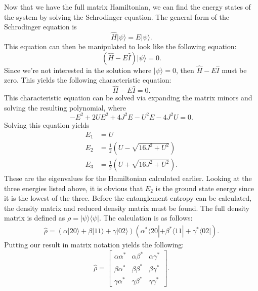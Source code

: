 \noindent Now that we have the full matrix Hamiltonian, we can find the energy states of the system by solving the Schrodinger equation. The general form of the Schrodinger equation is
\begin{equation}
\hat{H}|\psi\rangle = E|\psi\rangle.
\end{equation}
\noindent This equation can then be manipulated to look like the following equation:
\begin{equation}
\left( \hat{H}-E\hat{I} \right) |\psi\rangle = 0.
\end{equation}
\noindent Since we're not interested in the solution where $|\psi\rangle=0$, then $\hat{H}-E\hat{I}$ must be zero. This yields the following characteristic equation:
\begin{equation}
\hat{H}-E\hat{I} = 0.
\end{equation}
\noindent This characteristic equation can be solved via expanding the matrix minors and solving the resulting polynomial, where
\begin{equation}
-E^2 + 2UE^2 + 4J^2E - U^2E - 4J^2U = 0.
\end{equation}
\noindent Solving this equation yields 
\begin{align*}
E_1 &= U \\
E_2 &= \frac{1}{2} \left( U - \sqrt{16J^2 + U^2} \right) \\
E_3 &= \frac{1}{2} \left( U + \sqrt{16J^2 + U^2} \right).
\end{align*}
\noindent These are the eigenvalues for the Hamiltonian calculated earlier. Looking at the three energies listed above, it is obvious that $E_2$ is the ground state energy since it is the lowest of the three. Before the entanglement entropy can be calculated, the density matrix and reduced density matrix must be found. The full density matrix is defined as $\rho = |\psi \rangle \langle \psi|$. The calculation is as follows:
\begin{align}
\hat{\rho} = \left( \alpha |2 0 \rangle + \beta |1 1 \rangle + \gamma |0 2 \rangle \right) \left( \alpha^* \langle 2 0 | + \beta^* \langle 1 1| + \gamma^* \langle 0 2| \right).
\end{align}
\noindent Putting our result in matrix notation yields the following:
\begin{equation}
\hat{\rho} = \begin{bmatrix} \alpha \alpha^* & \alpha \beta^* & \alpha \gamma^* \\ \beta \alpha^* & \beta \beta^* & \beta \gamma^* \\ \gamma \alpha^* & \gamma \beta^* & \gamma \gamma^* \end{bmatrix}.
\end{equation}
